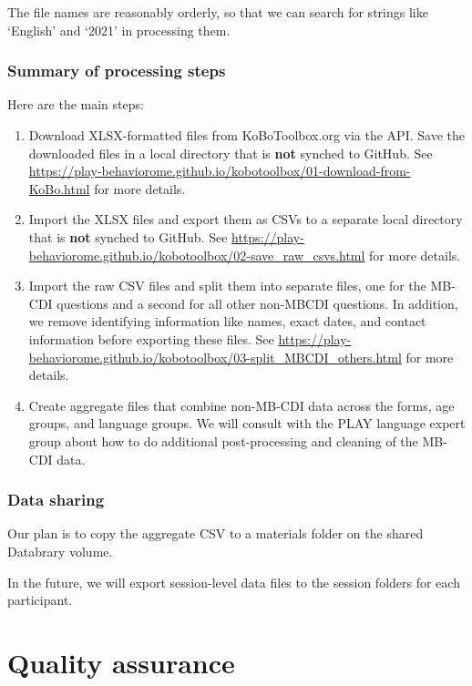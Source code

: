 \documentclass[
  12pt,
]{book}
\begin{document}
The file names are reasonably orderly, so that we can search for strings like `English' and `2021' in processing them.

\hypertarget{summary-of-processing-steps}{%
\subsection{Summary of processing steps}\label{summary-of-processing-steps}}

Here are the main steps:

\begin{enumerate}
\def\labelenumi{\arabic{enumi}.}
\item
  Download XLSX-formatted files from KoBoToolbox.org via the API. Save the downloaded files in a local directory that is \textbf{not} synched to GitHub. See \url{https://play-behaviorome.github.io/kobotoolbox/01-download-from-KoBo.html} for more details.
\item
  Import the XLSX files and export them as CSVs to a separate local directory that is \textbf{not} synched to GitHub. See \url{https://play-behaviorome.github.io/kobotoolbox/02-save_raw_csvs.html} for more details.
\item
  Import the raw CSV files and split them into separate files, one for the MB-CDI questions and a second for all other non-MBCDI questions. In addition, we remove identifying information like names, exact dates, and contact information before exporting these files. See \url{https://play-behaviorome.github.io/kobotoolbox/03-split_MBCDI_others.html} for more details.
\item
  Create aggregate files that combine non-MB-CDI data across the forms, age groups, and language groups. We will consult with the PLAY language expert group about how to do additional post-processing and cleaning of the MB-CDI data.
\end{enumerate}

\hypertarget{data-sharing}{%
\subsection{Data sharing}\label{data-sharing}}

Our plan is to copy the aggregate CSV to a materials folder on the shared Databrary volume.

In the future, we will export session-level data files to the session folders for each participant.

\hypertarget{quality-assurance}{%
\chapter{Quality assurance}\label{quality-assurance}}
\end{document}

